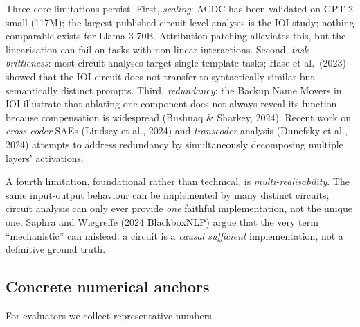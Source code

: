 Three core limitations persist. First, \emph{scaling}: ACDC has been validated on GPT-2 small (117M); the largest published circuit-level analysis is the IOI study; nothing comparable exists for Llama-3 70B. Attribution patching alleviates this, but the linearisation can fail on tasks with non-linear interactions. Second, \emph{task brittleness}: most circuit analyses target single-template tasks; Hase et al.~(2023) showed that the IOI circuit does not transfer to syntactically similar but semantically distinct prompts. Third, \emph{redundancy}: the Backup Name Movers in IOI illustrate that ablating one component does not always reveal its function because compensation is widespread (Bushnaq \& Sharkey, 2024). Recent work on \emph{cross-coder} SAEs (Lindsey et al., 2024) and \emph{transcoder} analysis (Dunefsky et al., 2024) attempts to address redundancy by simultaneously decomposing multiple layers' activations.

A fourth limitation, foundational rather than technical, is \emph{multi-realisability}. The same input-output behaviour can be implemented by many distinct circuits; circuit analysis can only ever provide \emph{one} faithful implementation, not the unique one. Saphra and Wiegreffe (2024 BlackboxNLP) argue that the very term ``mechanistic'' can mislead: a circuit is a \emph{causal sufficient} implementation, not a definitive ground truth.

\subsection{Concrete numerical anchors}\label{concrete-numerical-anchors}

For evaluators we collect representative numbers.

